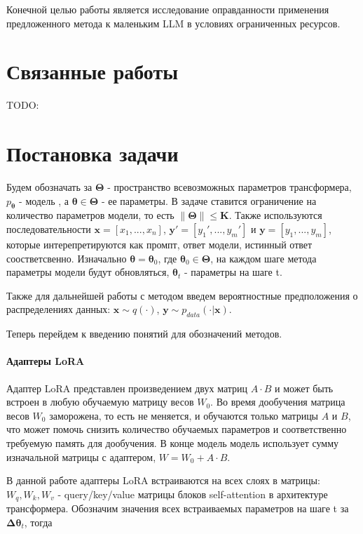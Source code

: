 \documentclass[12pt, twoside]{article}
\newcommand{\bx}{\mathbf{x}}
\newcommand{\by}{\mathbf{y}}
\newcommand{\btheta}{\boldsymbol{\theta}}
\newcommand{\bTheta}{\boldsymbol{\Theta}}
\newcommand{\bDelta}{\boldsymbol{\Delta}}
\begin{document}
Конечной целью работы является исследование оправданности применения предложенного метода к маленьким LLM в условиях ограниченных ресурсов.

\vspace{10}

\section{Связанные работы}

TODO:

\vspace{10}

\section{Постановка задачи}

Будем обозначать за $\bTheta$ - пространство всевозможных параметров трансформера, $p_{\btheta}$ - модель , а $\btheta \in \bTheta$ -  ее параметры. В задаче ставится ограничение на количество параметров модели, то есть $\|\bTheta\| \le \mathbf{K}$. Также используются последовательности $\bx = [x_1, ..., x_n]$, $\by' = [y_1', ..., y_m']$ и $\by=[y_1, ..., y_m]$, которые интерепретируются как промпт, ответ модели, истинный ответ соостветсвенно. Изначально $\btheta = \btheta_0$, где $\btheta_0 \in \bTheta$, на каждом шаге метода параметры модели будут обновляться, $\btheta_t$ - параметры на шаге t.

Также для дальнейшей работы с методом введем вероятностные предположения о распределениях данных: $\bx \sim q(\cdot)$,  $\by \sim p_{data}(\cdot | \bx)$. 

Теперь перейдем к введению понятий для обозначений методов.

\paragraph{Адаптеры LoRA}
Адаптер LoRA представлен произведением двух матриц $A \cdot B$ и может быть встроен в любую обучаемую матрицу весов $W_0$. Во время дообучения матрица весов $W_0$ заморожена, то есть не меняется, и обучаются только матрицы $A$ и $B$, что может помочь снизить количество обучаемых параметров и соответственно требуемую память для дообучения. В конце модель модель использует сумму изначальной матрицы с адаптером, $W = W_0 + A \cdot B$.

В данной работе адаптеры LoRA встраиваются на всех слоях в матрицы: $W_q, W_k, W_v$ - query/key/value матрицы блоков self-attention в архитектуре трансформера. Обозначим значения всех встраиваемых параметров на шаге t за $\bDelta\btheta_t$, тогда
\end{document}
